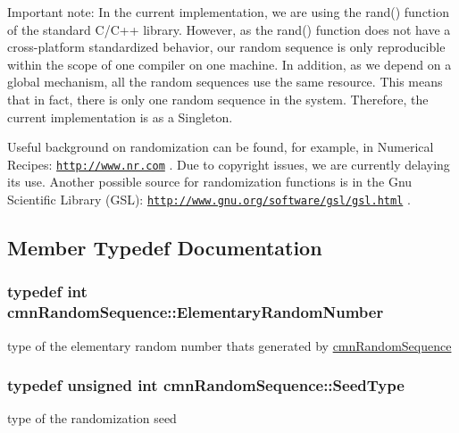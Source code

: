 Important note\+: In the current implementation, we are using the rand() function of the standard C/\+C++ library. However, as the rand() function does not have a cross-\/platform standardized behavior, our random sequence is only reproducible within the scope of one compiler on one machine. In addition, as we depend on a global mechanism, all the random sequences use the same resource. This means that in fact, there is only one random sequence in the system. Therefore, the current implementation is as a Singleton.

Useful background on randomization can be found, for example, in Numerical Recipes\+: \href{http://www.nr.com}{\tt http\+://www.\+nr.\+com} . Due to copyright issues, we are currently delaying its use. Another possible source for randomization functions is in the Gnu Scientific Library (G\+S\+L)\+: \href{http://www.gnu.org/software/gsl/gsl.html}{\tt http\+://www.\+gnu.\+org/software/gsl/gsl.\+html} . 

\subsection{Member Typedef Documentation}
\hypertarget{classcmn_random_sequence_a4728645d25009df6b70fd0db6340f92f}{}
\subsubsection[{Elementary\+Random\+Number}]{\setlength{\rightskip}{0pt plus 5cm}typedef int {\bf cmn\+Random\+Sequence\+::\+Elementary\+Random\+Number}}\label{classcmn_random_sequence_a4728645d25009df6b70fd0db6340f92f}
type of the elementary random number that\textquotesingle{}s generated by \hyperlink{classcmn_random_sequence}{cmn\+Random\+Sequence} \hypertarget{classcmn_random_sequence_a7b97009536ce38559fa5fb86a9eea16d}{}
\subsubsection[{Seed\+Type}]{\setlength{\rightskip}{0pt plus 5cm}typedef unsigned int {\bf cmn\+Random\+Sequence\+::\+Seed\+Type}}\label{classcmn_random_sequence_a7b97009536ce38559fa5fb86a9eea16d}
type of the randomization seed \hypertarget{classcmn_random_sequence_ac3befd667513146020ef266429e205b0}{}
